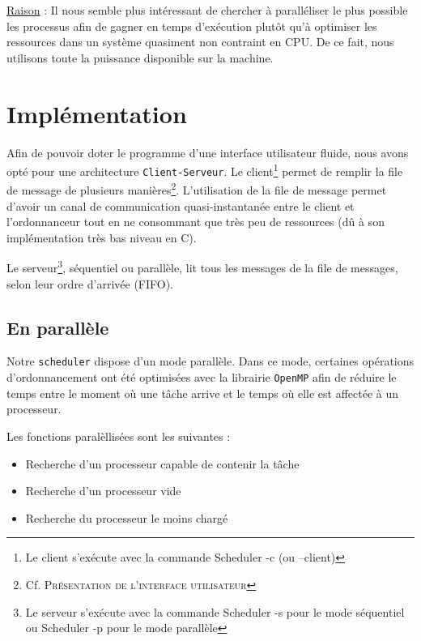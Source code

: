    \underline{Raison} : Il nous semble plus intéressant de chercher à paralléliser le plus possible les processus afin de gagner en temps d'exécution plutôt qu'à optimiser les ressources dans un système quasiment non contraint en CPU. De ce fait, nous utilisons toute la puissance disponible sur la machine.\newline
    
    
    \section{Implémentation}
    
    Afin de pouvoir doter le programme d'une interface utilisateur fluide, nous avons opté pour une architecture \texttt{Client-Serveur}. Le client\footnote{Le client s'exécute avec la commande Scheduler -c (ou --client)} permet de remplir la file de message de plusieurs manières\footnote{Cf. \textsc{Présentation de l'interface utilisateur}}. L'utilisation de la file de message permet d'avoir un canal de communication quasi-instantanée entre le client et l'ordonnanceur tout en ne consommant que très peu de ressources (dû à son implémentation très bas niveau en C).\newline
    
    Le serveur\footnote{Le serveur s'exécute avec la commande Scheduler -s pour le mode séquentiel ou Scheduler -p pour le mode parallèle}, séquentiel ou parallèle, lit tous les messages de la file de messages, selon leur ordre d'arrivée (FIFO).
    
    
    \subsection{En parallèle}
    
    Notre \texttt{scheduler} dispose d'un mode parallèle. Dans ce mode, certaines opérations d'ordonnancement ont été optimisées avec la librairie \texttt{OpenMP} afin de réduire le temps entre le moment où une tâche arrive et le temps où elle est affectée à un processeur. \newline
    
    Les fonctions paralèllisées sont les suivantes : 
    
    \begin{itemize}
        \item Recherche d'un processeur capable de contenir la tâche
        \item Recherche d'un processeur vide
        \item Recherche du processeur le moins chargé
    \end{itemize}
    
